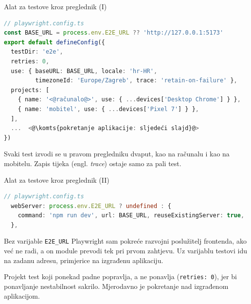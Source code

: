 \begin{frame}[fragile]{Alat za testove kroz preglednik (I)}
\begin{lstlisting}[language=typescript]
// playwright.config.ts
const BASE_URL = process.env.E2E_URL ?? 'http://127.0.0.1:5173'
export default defineConfig({
  testDir: 'e2e',
  retries: 0,
  use: { baseURL: BASE_URL, locale: 'hr-HR',
         timezoneId: 'Europe/Zagreb', trace: 'retain-on-failure' },
  projects: [
    { name: '<@računalo@>', use: { ...devices['Desktop Chrome'] } },
    { name: 'mobitel', use: { ...devices['Pixel 7'] } },
  ],
  ...  <@\komts{pokretanje aplikacije: sljedeći slajd}@>
})
\end{lstlisting}

\vspace{0.3em}
Svaki test izvodi se u pravom pregledniku dvaput, kao na računalu i kao na mobitelu. Zapis tijeka (engl. \emph{trace}) ostaje samo za pali test.
\end{frame}


\begin{frame}[fragile]{Alat za testove kroz preglednik (II)}
\begin{lstlisting}[language=typescript]
// playwright.config.ts
  webServer: process.env.E2E_URL ? undefined : {
    command: 'npm run dev', url: BASE_URL, reuseExistingServer: true,
  },
\end{lstlisting}

\vspace{0.3em}
Bez varijable \texttt{E2E\_URL} Playwright sam pokreće razvojni poslužitelj frontenda, ako već ne radi, a on module prevodi tek pri prvom zahtjevu. Uz varijablu testovi idu na zadanu adresu, primjerice na izgrađenu aplikaciju.

\vspace{0.5em}
\begin{konvencija}
Projekt test koji ponekad padne popravlja, a ne ponavlja (\texttt{retries: 0}), jer bi ponavljanje nestabilnost sakrilo. Mjerodavno je pokretanje nad izgrađenom aplikacijom.
\end{konvencija}
\end{frame}

